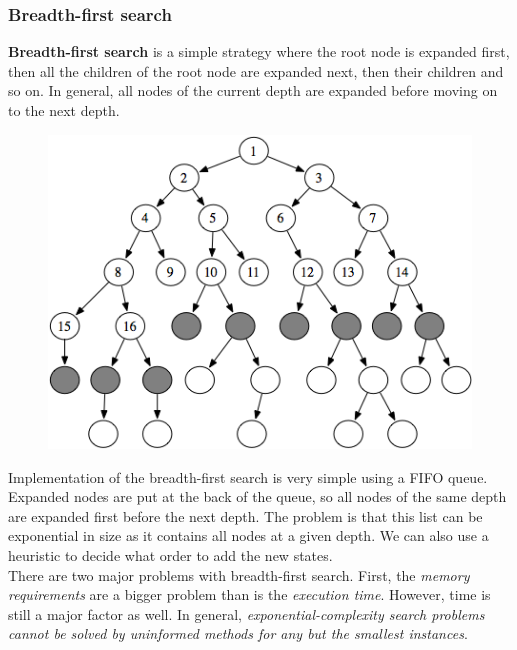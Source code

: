 \documentclass{article}
\newcommand{\n}[0]{\\[\baselineskip]}
\begin{document}
\subsubsection{Breadth-first search}
\textbf{Breadth-first search} is a simple strategy where the root node is expanded first, then all the children of the root node are expanded next, then their children and so on. In general, all nodes of the current depth are expanded before moving on to the next depth. 
\begin{figure}[H]
\centering
\includegraphics[width=1\textwidth, keepaspectratio]{imgs/breadth-first-search.png}
\end{figure}
\noindent
Implementation of the breadth-first search is very simple using a FIFO queue. Expanded nodes are put at the back of the queue, so all nodes of the same depth are expanded first before the next depth. The problem is that this list can be exponential in size as it contains all nodes at a given depth. We can also use a heuristic to decide what order to add the new states.
\n
There are two major problems with breadth-first search. First, the \textit{memory requirements} are a bigger problem than is the \textit{execution time}. However, time is still a major factor as well. In general, \textit{exponential-complexity search problems cannot be solved by uninformed methods for any but the smallest instances}.
\end{document}
